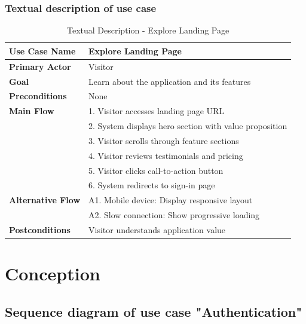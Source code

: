 \subsubsection{Textual description of use case}
\begin{table}[H]
\centering
\caption{Textual Description - Explore Landing Page}
\label{tab:landing_page_description}
\begin{tabular}{|p{3cm}|p{10cm}|}
\hline
\textbf{Use Case Name} & Explore Landing Page \\
\hline
\textbf{Primary Actor} & Visitor \\
\hline
\textbf{Goal} & Learn about the application and its features \\
\hline
\textbf{Preconditions} & None \\
\hline
\textbf{Main Flow} & 
1. Visitor accesses landing page URL \\
& 2. System displays hero section with value proposition \\
& 3. Visitor scrolls through feature sections \\
& 4. Visitor reviews testimonials and pricing \\
& 5. Visitor clicks call-to-action button \\
& 6. System redirects to sign-in page \\
\hline
\textbf{Alternative Flow} & 
A1. Mobile device: Display responsive layout \\
& A2. Slow connection: Show progressive loading \\
\hline
\textbf{Postconditions} & Visitor understands application value \\
\hline
\end{tabular}
\end{table}

\section{Conception}

\subsection{Sequence diagram of use case "Authentication"}

